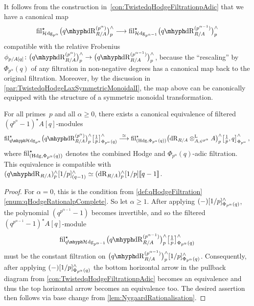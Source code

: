 \documentclass[DIV=12,numbers=enddot,leqno,bibliography=totoc]{scrartcl}
\begin{document}
	\begin{numpar}\label{par:TwistedqHodgeLaxSymmetricMonoidalII}
		It follows from the construction in~\cref{con:TwistedqHodgeFiltrationpAdic} that we have a canonical map
		\begin{equation*}
			\fil_{\Hhodge_{p^\alpha}}^\star \bigl(\qdeRham_{R/A}^{(p^\alpha)}\bigr)_p^\complete\longrightarrow  \fil_{\Hhodge_{p^{\alpha-1}}}^\star \bigl(\qdeRham_{R/A}^{(p^{\alpha-1})}\bigr)_p^\complete
		\end{equation*}
		compatible with the relative Frobenius $\phi_{p/A[q]}\colon \bigl(\qdeRham_{R/A}^{(p^\alpha)}\bigr)_p^\complete\rightarrow\bigl(\qdeRham_{R/A}^{(p^{\alpha-1})}\bigr)_p^\complete$, because the \enquote{rescaling} by $\Phi_{p^\alpha}(q)$ of any filtration in non-negative degrees has a canonical map back to the original filtration. Moreover, by the discussion in \cref{par:TwistedqHodgeLaxSymmetricMonoidalI}, the map above can be canonically equipped with the structure of a symmetric monoidal transformation.
	\end{numpar}
	\begin{lem}\label{lem:TwistedqHodgepAdicCompatibilityI}
		For all primes~$p$ and all $\alpha\geqslant 0$, there exists a canonical equivalence of filtered $(q^{p^\alpha}-1)^\star A[q]$-modules
		\begin{equation*}
			\fil_{\qHhodge_{p^\alpha}}^\star \bigl(\qdeRham_{R/A}^{(p^\alpha)}\bigr)_p^\complete\bigl[\localise{p}\bigr]_{\Phi_{p^\alpha}(q)}^\complete\overset{\simeq}{\longrightarrow} \fil_{(\Hodge,\Phi_{p^\alpha}(q))}^\star \bigl(\deRham_{R/A}\lotimes_{A,\psi^{p^\alpha}}A\bigr)_p^\complete\bigl[\localise{p},q\bigr]_{\Phi_{p^\alpha}}^\complete\,,
		\end{equation*}
		where $ \operatorname{fil}_{(\mathrm{Hdg},\Phi_{p^\alpha}(q))}^\star $ denotes the combined Hodge and $\Phi_{p^\alpha}(q)$-adic filtration. This equivalence
		is compatible with $(\qdeRham_{R/A})_p^\complete[1/p]_{(q-1)}^\complete\simeq (\deRham_{R/A})_p^\complete[1/p]\qpower$.
	\end{lem}
	\begin{proof}
		For $\alpha=0$, this is the condition from \cref{def:qHodgeFiltration}\cref{enum:qHodgeRationalpComplete}. So let $\alpha\geqslant 1$. After applying $(-)[1/p]_{\Phi_{p^\alpha}(q)}^\wedge$, the polynomial $(q^{p^{\alpha-1}}-1)$ becomes invertible, and so the filtered $(q^{p^{\alpha-1}}-1)^\star A[q]$-module
		\begin{equation*}
			\fil_{\qHhodge_{p^{\alpha-1}}}^\star \bigl(\qdeRham_{R/A}^{(p^{\alpha-1})}\bigr)_p^\complete\bigl[\localise{p}\bigr]_{\Phi_{p^\alpha}(q)}^\complete
		\end{equation*}
		must be the constant filtration on $\bigl(\qdeRham_{R/A}^{(p^{\alpha-1})}\bigr)_p^\complete[1/p]_{\Phi_{p^\alpha}(q)}^\complete$. Consequently, after applying $(-)[1/p]_{\Phi_{p^\alpha}(q)}^\wedge$ the bottom horizontal arrow in the pullback diagram from \cref{con:TwistedqHodgeFiltrationpAdic} becomes an equivalence and thus the top horizontal arrow becomes an equivalence too. The desired assertion then follows via base change from \cref{lem:NygaardRationalisation}.
	\end{proof}
\end{document}
